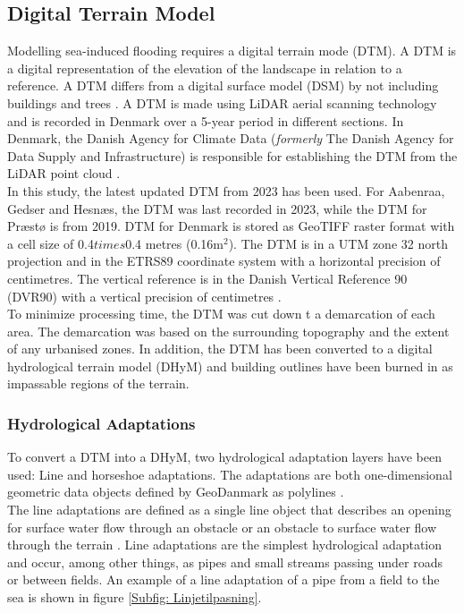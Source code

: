\subsection{Digital Terrain Model}

Modelling sea-induced flooding requires a digital terrain mode (DTM). A DTM is a digital representation of the elevation of the landscape in relation to a reference. A DTM differs from a digital surface model (DSM) by not including buildings and trees \citep{sdfe_dhm_2020}. A DTM is made using LiDAR aerial scanning technology and is recorded in Denmark over a 5-year period in different sections. In Denmark, the Danish Agency for Climate Data (\textit{formerly} The Danish Agency for Data Supply and Infrastructure) is responsible for establishing the DTM from the LiDAR point cloud \citep{sdfe_dhm_2020}.\\

In this study, the latest updated DTM from 2023 has been used. For Aabenraa, Gedser and Hesnæs, the DTM was last recorded in 2023, while the DTM for Præstø is from 2019. DTM for Denmark is stored as GeoTIFF raster format with a cell size of 0.4$times$0.4 metres (0.16m$^{2}$). The DTM is in a UTM zone 32 north projection and in the ETRS89 coordinate system with a horizontal precision of  centimetres. The vertical reference is in the Danish Vertical Reference 90 (DVR90) with a vertical precision of  centimetres \citep{sdfe_dhm_2020}.\\
To minimize processing time, the DTM was cut down t a demarcation of each area. The demarcation was based on the surrounding topography and the extent of any urbanised zones. In addition, the DTM has been converted to a digital hydrological terrain model (DHyM) and building outlines have been burned in as impassable regions of the terrain.

\subsubsection{Hydrological Adaptations}
To convert a DTM into a DHyM, two hydrological adaptation layers have been used: Line and horseshoe adaptations. The adaptations are both one-dimensional geometric data objects defined by GeoDanmark as polylines \citep{GeoDanmark_HydroLag}.\\
The line adaptations are defined as a single line object that describes an opening for surface water flow through an obstacle or an obstacle to surface water flow through the terrain \citep{DHMLinje}. Line adaptations are the simplest hydrological adaptation and occur, among other things, as pipes and small streams passing under roads or between fields. An example of a line adaptation of a pipe from a field to the sea is shown in figure \ref{Subfig: Linjetilpasning}.\\

